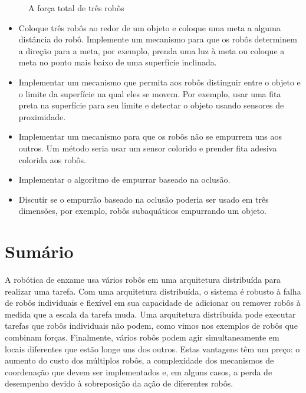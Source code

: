 \begin{figure}
\begin{center}
\caption{A força total de três robôs}\label{fig.total-force}
\end{center}
\end{figure}

\begin{framed}
\begin{itemize}
\item Coloque três robôs ao redor de um objeto e coloque uma meta a alguma distância do robô. Implemente um mecanismo para que os robôs determinem a direção para a meta, por exemplo, prenda uma luz à meta ou coloque a meta no ponto mais baixo de uma superfície inclinada.
\item Implementar um mecanismo que permita aos robôs distinguir entre o objeto e o limite da superfície na qual eles se movem. Por exemplo, usar uma fita preta na superfície para seu limite e detectar o objeto usando sensores de proximidade.
\item Implementar um mecanismo para que os robôs não se empurrem uns aos outros. Um método seria usar um sensor colorido e prender fita adesiva colorida aos robôs.
\item Implementar o algoritmo de empurrar baseado na oclusão.
\item Discutir se o empurrão baseado na oclusão poderia ser usado em três dimensões, por exemplo, robôs subaquáticos empurrando um objeto.
\end{itemize}
\end{framed}

\section{Sumário}

A robótica de enxame usa vários robôs em uma arquitetura distribuída para realizar uma tarefa. Com uma arquitetura distribuída, o sistema é robusto à falha de robôs individuais e flexível em sua capacidade de adicionar ou remover robôs à medida que a escala da tarefa muda. Uma arquitetura distribuída pode executar tarefas que robôs individuais não podem, como vimos nos exemplos de robôs que combinam forças. Finalmente, vários robôs podem agir simultaneamente em locais diferentes que estão longe uns dos outros. Estas vantagens têm um preço: o aumento do custo dos múltiplos robôs, a complexidade dos mecanismos de coordenação que devem ser implementados e, em alguns casos, a perda de desempenho devido à sobreposição da ação de diferentes robôs. 

